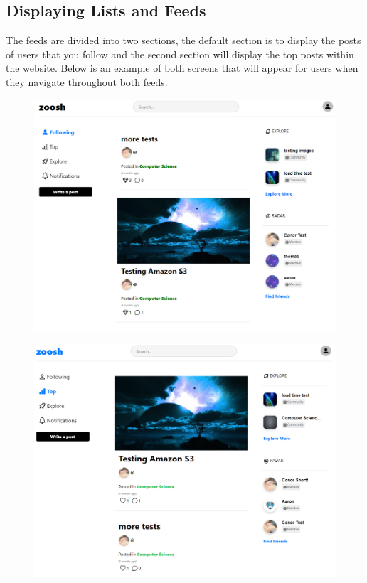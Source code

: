 \newpage
\subsection{Displaying Lists and Feeds}

The feeds are divided into two sections, the default section is to display the posts of users that you follow and the second section will display the top posts within the website. Below is an example of both screens that will appear for users when they navigate throughout both feeds.

\begin{figure}[H]
  \centering
  \includegraphics[scale=0.35]{img/following.PNG}
  \label{fig:Following Feed.}
\end{figure}

\begin{figure}[H]
  \centering
  \includegraphics[scale=0.35]{img/top.PNG}
  \label{fig:Top Posts Feed.}
\end{figure}

